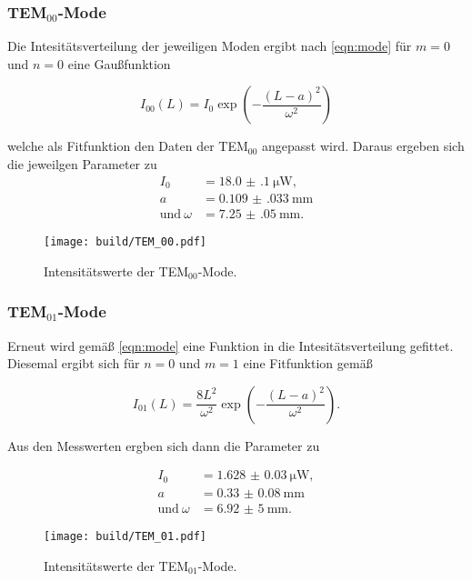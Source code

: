 \subsubsection{TEM$_{00}$-Mode}

Die Intesitätsverteilung der jeweiligen Moden ergibt nach \eqref{eqn:mode} für $m=0$ und $n=0$ eine Gaußfunktion

\begin{equation}
    I_{00}(L) = I_0 \exp{\left(-\frac{(L-a)^2}{\omega^2}\right)}
\end{equation} 

welche als Fitfunktion den Daten der TEM$_{00}$ angepasst wird.
Daraus ergeben sich die jeweilgen Parameter zu
\begin{align*}
    I_0 &= \SI{18.0(1)}{\micro\watt}, \\
    a &= \SI{0.109(033)}{\milli\m} \\
    \text{und} \: \omega &= \SI{7.25(05)}{\milli\m}.
\end{align*}

\begin{figure}
    \centering
    \texttt{[image: build/TEM\_00.pdf]}
    \caption{Intensitätswerte der TEM$_{00}$-Mode.}
    \label{fig:TEM00}
\end{figure}


\subsubsection{TEM$_{01}$-Mode}

Erneut wird gemäß \eqref{eqn:mode} eine Funktion in die Intesitätsverteilung gefittet. Diesemal ergibt sich für $n=0$ und $m=1$ 
eine Fitfunktion gemäß

\begin{equation}
    I_{01}(L) = \frac{8L^2}{\omega^2} \exp{\left(-\frac{(L-a)^2}{\omega^2} \right)} .
\end{equation}

Aus den Messwerten ergben sich dann die Parameter zu

\begin{align*}
    I_0 &= \SI{1.628(30)}{\micro\watt}, \\
    a &= \SI{0.33(8)}{\milli\m} \\
    \text{und} \: \omega &= \SI{6,92(5)}{\milli\m}.
\end{align*}

\begin{figure}
    \centering
    \texttt{[image: build/TEM\_01.pdf]}
    \caption{Intensitätswerte der TEM$_{01}$-Mode.}
    \label{fig:TEM01}
\end{figure}

